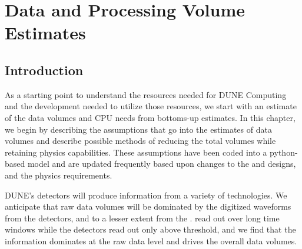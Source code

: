 \documentclass[../main-v1.tex]{subfiles}
\begin{document}
\chapter{Data and Processing Volume Estimates }

\label{ch:est}
 


\section{Introduction }%
As a starting point to understand the resources needed for DUNE Computing and the development needed to utilize those resources, we start with an estimate of the data volumes and CPU needs from bottoms-up estimates. 
In this chapter, we begin by describing the assumptions that go into the estimates of data volumes and describe possible methods of reducing the total volumes while retaining physics capabilities. 
These assumptions have been coded into a python-based model and are updated frequently based upon changes to the  and  designs, and the physics requirements.



DUNE's detectors will produce information from a variety of technologies.  We anticipate that raw data volumes will be dominated by the digitized waveforms from the  detectors, and to a lesser extent from the .  read out over long time windows while the  detectors read out only above threshold, and we find that the  information dominates at the raw data level and drives the overall data volumes. %
\end{document}
